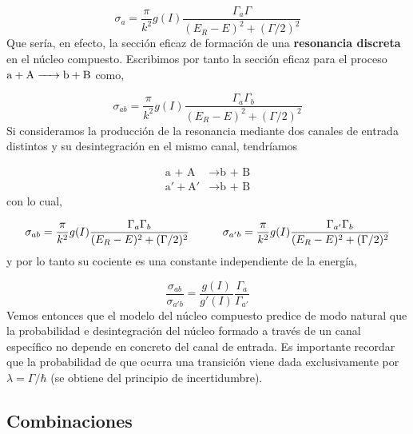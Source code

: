 \begin{equation}
	\sigma_a = \frac{\pi}{k^2} g(I) \frac{\Gamma_a \Gamma}{(E_R-E)^2 + (\Gamma /2)^2}
\end{equation}
Que sería, en efecto, la sección eficaz de formación de una \textbf{resonancia discreta} en el núcleo compuesto. Escribimos por tanto la sección eficaz para el proceso $\ce{a + A -> b + B}$ como,

\begin{equation}
	\sigma_{ab} = \frac{\pi}{k^2} g(I) \frac{\Gamma_a  \Gamma_b}{(E_R-E)^2 + (\Gamma/2)^2}
\end{equation}
Si consideramos la producción de la resonancia mediante dos canales de entrada distintos y su desintegración en el mismo canal, tendríamos 


\begin{equation}
\begin{split}
	\text{a + A} & \rightarrow  \text{b + B} \\
	\text{a}' + \text{A}' & \rightarrow \text{b + B}
\end{split}
\end{equation}
con lo cual, 

\begin{equation}
	\sigma_{ab} = \frac{\pi}{k^2} g(I) \frac{\Gamma_a \Gamma_b}{ (E_R-E)^2 + (\Gamma /2 )^2} \quad \quad \quad \sigma_{a 'b} = \frac{\pi}{k^2} g(I) \frac{ \Gamma_{a'} \Gamma_b}{(E_R-E)^2 + (\Gamma /2 )^2}
\end{equation}
y por lo tanto su cociente es una constante independiente de la energía,

\begin{equation}
	\frac{\sigma_{ab}}{\sigma_{a'b}} = \frac{g(I)}{g'(I)} \frac{\Gamma_{a}}{\Gamma_{a'}}
\end{equation}
Vemos entonces que el modelo del núcleo compuesto predice de modo natural que la probabilidad e desintegración del núcleo formado a través de un canal específico no depende en concreto del canal de entrada. Es importante recordar que la probabilidad  de que ocurra una transición viene dada exclusivamente por $\lambda = \Gamma / \hbar$ (se obtiene del principio de incertidumbre).

\subsection{Combinaciones}

